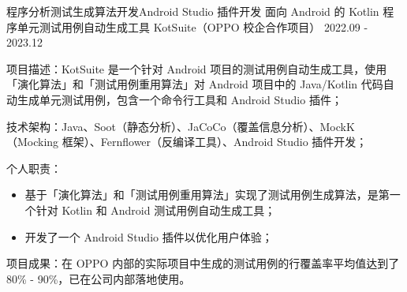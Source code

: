 \begin{cventries}
  \cventry
    {程序分析{\enskip\cdotp\enskip}测试生成算法开发{\enskip\cdotp\enskip}Android Studio 插件开发} %
    {面向 Android 的 Kotlin 程序单元测试用例自动生成工具 KotSuite（OPPO 校企合作项目）} %
    {2022.09 - 2023.12} %
    {} %
    {
      \begin{cvitems} %
        \item {项目描述：KotSuite 是一个针对 Android 项目的测试用例自动生成工具，使用「演化算法」和「测试用例重用算法」对 Android 项目中的 Java/Kotlin 代码自动生成单元测试用例，包含一个命令行工具和 Android Studio 插件；}
        \item {技术架构：Java、Soot（静态分析）、JaCoCo（覆盖信息分析）、MockK（Mocking 框架）、Fernflower（反编译工具）、Android Studio 插件开发；}
        \item {个人职责：}
          \begin{itemize}
            \item {基于「演化算法」和「测试用例重用算法」实现了测试用例生成算法，是第一个针对 Kotlin 和 Android 测试用例自动生成工具；}
            \item {开发了一个 Android Studio 插件以优化用户体验；}
          \end{itemize}
        \item {项目成果：在 OPPO 内部的实际项目中生成的测试用例的行覆盖率平均值达到了 80\% - 90\%，已在公司内部落地使用。}
      \end{cvitems}
    }


\end{cventries}
